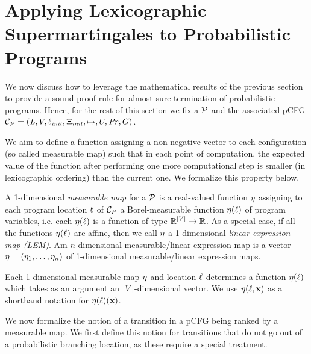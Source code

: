 \section{Applying Lexicographic Supermartingales to Probabilistic Programs}

We now discuss how to leverage the mathematical results of the previous section 
to provide a sound proof rule for almost-sure termination of probabilistic 
programs. Hence, for the rest of this section we fix a \PP{} $\mathcal{P}$ and the 
associated pCFG 
$\mathcal{C}_{\mathcal{P}}=(\mathit{L},V,\ell_{\mathit{init}},\Xi_{\mathit{init}},\mapsto,U,\mathit{Pr},G)$.

We aim to define a function assigning a non-negative vector to each 
configuration (so called measurable map) such that in each point of 
computation, the expected value of the function after performing one more 
computational step is smaller (in lexicographic ordering) than the current one. 
We formalize this property below.

\begin{definition}
A 1-dimensional \emph{measurable map} for a \PP{} $\mathcal{P}$ is a  
real-valued function $\eta$ 
assigning to each program location $\ell$ of $\mathcal{C}_P$ a Borel-measurable function $\eta(\ell)$  of program variables, i.e. each $\eta(\ell)$  is a function of type $\mathbb{R}^{|V|}\rightarrow \mathbb{R}$. As a special case, if all the functions $\eta(\ell)$ are affine, then we call $\eta$ a 1-dimensional \emph{linear expression map (LEM)}. 
Am $n$-dimensional measurable/linear expression map is a vector $\mathbf{\eta}=(\eta_1,\dots,\eta_n)$ of 1-dimensional measurable/linear expression maps. 
\end{definition}

Each 1-dimensional measurable map $\eta$ and location $\ell$ determines a function $\eta(\ell)$ 
which takes as an argument an $|V|$-dimensional vector. We use $\eta(\ell,\mathbf{x})$ as a shorthand 
notation for $\eta(\ell)(\mathbf{x})$.

We now formalize the notion of a transition in a pCFG being ranked by a 
measurable map. We first define this notion for transitions that do not go out 
of a probabilistic branching location, as these require a special treatment.

